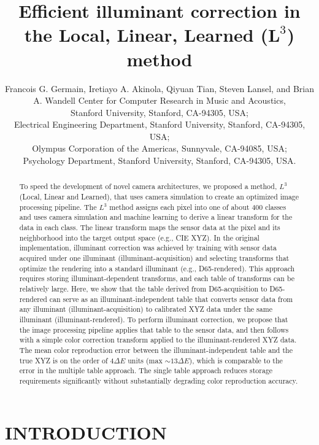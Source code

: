 \documentclass[]{spie}
\title{Efficient illuminant correction in the Local, Linear, Learned ({\LARGE$\boldsymbol L^3$}) method}
\author{Francois G. Germain\supit{a}, Iretiayo A. Akinola\supit{b}, Qiyuan Tian\supit{b}, Steven Lansel\supit{c}, and Brian A. Wandell\supit{b,d}
\skiplinehalf
\supit{a}Center for Computer Research in Music and Acoustics,\\ Stanford University, Stanford, CA-94305, USA;\\
\supit{b}Electrical Engineering Department, Stanford University, Stanford, CA-94305, USA;\\
\supit{c}Olympus Corporation of the Americas, Sunnyvale, CA-94085, USA;\\
\supit{d}Psychology Department, Stanford University, Stanford, CA-94305, USA.
}
\begin{document}
\maketitle

\begin{abstract}

To speed the development of novel camera architectures, we proposed a method,  $L^3$  (Local, Linear and Learned), that uses camera simulation to create an optimized image processing pipeline. The $L^3$  method assigns each pixel into one of about 400 classes and uses camera simulation and machine learning to derive a linear transform for the data in each class.  The linear transform maps the sensor data at the pixel and its neighborhood into the target output space (e.g., CIE XYZ).  In the original implementation, illuminant correction was achieved by training with sensor data acquired under one illuminant (illuminant-acquisition) and selecting transforms that optimize the rendering into a standard illuminant (e.g., D65-rendered). This approach requires storing illuminant-dependent transforms, and each table of transforms can be relatively large. Here, we show that the table derived from D65-acquisition to D65-rendered can serve as an illuminant-independent table that converts sensor data from any illuminant (illuminant-acquisition) to calibrated XYZ data under the same illuminant (illuminant-rendered). To perform illuminant correction, we propose that the image processing pipeline applies that table to the sensor data, and then follows with a simple color correction transform applied to the illuminant-rendered XYZ data. The mean color reproduction error between the illuminant-independent table and the true XYZ is on the order of 4$\Delta E$  units (max $\sim 13 \Delta E$), which is comparable to the error in the multiple table approach. The single table approach reduces storage requirements significantly without substantially  degrading color reproduction accuracy.


\end{abstract}


\section{INTRODUCTION}
\end{document}
